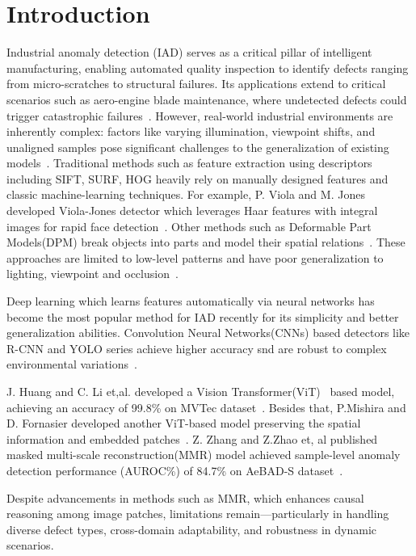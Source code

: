 \section{Introduction}
Industrial anomaly detection (IAD) serves as a critical pillar of intelligent manufacturing, enabling automated quality inspection to identify defects ranging from micro-scratches to structural failures. 
Its applications extend to critical scenarios such as aero-engine blade maintenance, where undetected defects could trigger catastrophic failures~\cite{intro1}. 
However, real-world industrial environments are inherently complex: factors like varying illumination, viewpoint shifts, and unaligned samples pose significant challenges to the generalization of existing models~\cite{intro2}. 
Traditional methods such as feature extraction using descriptors including SIFT, SURF, HOG heavily rely on manually designed features 
and classic machine-learning techniques. For example, P. Viola and M. Jones developed Viola-Jones detector which leverages Haar features with integral images for rapid face detection~\cite{Viola-Jones}.
Other methods such as Deformable Part Models(DPM) break objects into parts and model their spatial relations~\cite{DFM}.
These approaches are limited to low-level patterns and have poor generalization to lighting, viewpoint and occlusion~\cite{why-traditional-bad}.

Deep learning which learns features automatically via neural networks has become the most popular method for IAD recently 
for its simplicity and better generalization abilities. Convolution Neural Networks(CNNs) based detectors like R-CNN and YOLO series
achieve higher accuracy snd are robust to complex environmental variations~\cite{why-traditional-bad,survey-ml1}.

J. Huang and C. Li et,al. developed a Vision Transformer(ViT)~\cite{VIT} based model, achieving an accuracy of 99.8\% on MVTec dataset~\cite{VIT-model1}.
Besides that, P.Mishira and D. Fornasier developed another ViT-based model preserving the spatial information and embedded patches~\cite{VIT-model2}.
Z. Zhang and Z.Zhao et, al published masked multi-scale reconstruction(MMR) model 
achieved sample-level anomaly detection performance (AUROC\%) of 84.7\% on AeBAD-S dataset~\cite{MMR}. 

Despite advancements in methods such as MMR, which enhances causal reasoning among image patches, limitations remain—particularly in handling diverse defect types, cross-domain adaptability, and robustness in dynamic scenarios.

